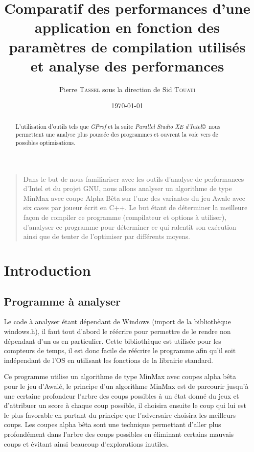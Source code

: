 \documentclass[
 aip,
 jmp,
 amsmath,amssymb,
 reprint
]{revtex4-1}
\begin{document}
\title{Comparatif des performances d'une application en fonction des paramètres de compilation utilisés et analyse des performances}

\author{Pierre \textsc{Tassel} sous la direction de Sid \textsc{Touati}}

\date[Date: ]{\today}

\begin{abstract}
L'utilisation d'outils tels que \textit{GProf} et la suite \textit{Parallel Studio XE d'Intel}\copyright \, nous permettent une analyse plus poussée des programmes et ouvrent la voie vers de possibles optimisations.
\end{abstract}

\maketitle

\hypersetup{linkcolor=blue}
\begin{quotation}
Dans le but de nous familiariser avec les outils d'analyse de performances d'Intel et du projet GNU, nous allons analyser un algorithme de type MinMax avec coupe Alpha Bêta\pageref{Fig:alpha_beta} sur l'une des variantes du jeu Awale\pageref{Fig:awale} avec six cases par joueur écrit en C++. Le but étant de déterminer la meilleure façon de compiler ce programme (compilateur et options à utiliser), d'analyser ce programme pour déterminer ce qui ralentit son exécution ainsi que de tenter de l'optimiser par différents moyens.
\end{quotation}

\hypersetup{linkcolor=black}
\tableofcontents

\hypersetup{linkcolor=blue}
\section{Introduction}
\subsection{Programme à analyser}
Le code à analyser étant dépendant de Windows (import de la bibliothèque windows.h), il faut tout d'abord le réécrire pour permettre de le rendre non dépendant d'un os en particulier. Cette bibliothèque est utilisée pour les compteurs de temps, il est donc facile de réécrire le programme afin qu'il soit indépendant de l'OS en utilisant les fonctions de la librairie standard.\par
Ce programme utilise un algorithme de type MinMax avec coupes alpha bêta\pageref{Fig:alpha_beta} pour le jeu d'Awalé\pageref{Fig:awale}, le principe d'un algorithme MinMax est de parcourir jusqu'à une certaine profondeur l'arbre des coups possibles à un état donné du jeux et d'attribuer un score à chaque coup possible, il choisira ensuite le coup qui lui est le plus favorable en partant du principe que l'adversaire choisira les meilleurs coups. Les coupes alpha bêta sont une technique permettant d'aller plus profondément dans l'arbre des coups possibles en éliminant certains mauvais coups et évitant ainsi beaucoup d'explorations inutiles.
\end{document}
